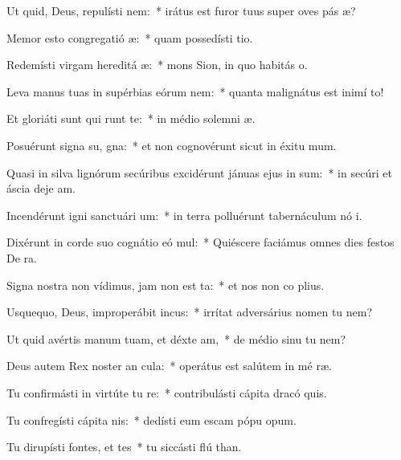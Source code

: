 \item Ut quid, Deus, repulísti  nem:~* irátus est furor tuus super oves pás æ?
\item Memor esto congregatió æ:~* quam possedísti  tio.
\item Redemísti virgam hereditá æ:~* mons Sion, in quo habitás  o.
\item Leva manus tuas in supérbias eórum  nem:~* quanta malignátus est inimí  to!
\item Et gloriáti sunt qui runt te:~* in médio solemni æ.
\item Posuérunt signa su, gna:~* et non cognovérunt sicut in éxitu  mum.
\item Quasi in silva lignórum secúribus excidérunt jánuas ejus in sum:~* in secúri et áscia deje am.
\item Incendérunt igni sanctuári um:~* in terra polluérunt tabernáculum nó i.
\item Dixérunt in corde suo cognátio eó mul:~* Quiéscere faciámus omnes dies festos De  ra.
\item Signa nostra non vídimus, jam non est ta:~* et nos non co plius.
\item Usquequo, Deus, improperábit incus:~* irrítat adversárius nomen tu  nem?
\item Ut quid avértis manum tuam, et déxte am,~* de médio sinu tu  nem?
\item Deus autem Rex noster an cula:~* operátus est salútem in mé ræ.
\item Tu confirmásti in virtúte tu re:~* contribulásti cápita dracó  quis.
\item Tu confregísti cápita nis:~* dedísti eum escam pópu opum.
\item Tu dirupísti fontes, et tes~* tu siccásti flú than.

